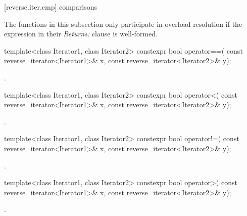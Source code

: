 [reverse.iter.cmp]{ comparisons}

\begin{addedblock}
\pnum
The functions in this subsection only participate in overload resolution if the
expression in their \textit{Returns:} clause is well-formed.
\end{addedblock}

%
\begin{itemdecl}
template<class Iterator1, class Iterator2>
  constexpr bool operator==(
    const reverse_iterator<Iterator1>& x,
    const reverse_iterator<Iterator2>& y);
\end{itemdecl}

\begin{itemdescr}
\pnum
\returns
{}.
\end{itemdescr}

%
\begin{itemdecl}
template<class Iterator1, class Iterator2>
  constexpr bool operator<(
    const reverse_iterator<Iterator1>& x,
    const reverse_iterator<Iterator2>& y);
\end{itemdecl}

\begin{itemdescr}
\pnum
\returns
{}.
\end{itemdescr}

%
\begin{itemdecl}
template<class Iterator1, class Iterator2>
  constexpr bool operator!=(
    const reverse_iterator<Iterator1>& x,
    const reverse_iterator<Iterator2>& y);
\end{itemdecl}

\begin{itemdescr}
\pnum
\returns
{}.
\end{itemdescr}

%
\begin{itemdecl}
template<class Iterator1, class Iterator2>
  constexpr bool operator>(
    const reverse_iterator<Iterator1>& x,
    const reverse_iterator<Iterator2>& y);
\end{itemdecl}

\begin{itemdescr}
\pnum
\returns
{}.
\end{itemdescr}

